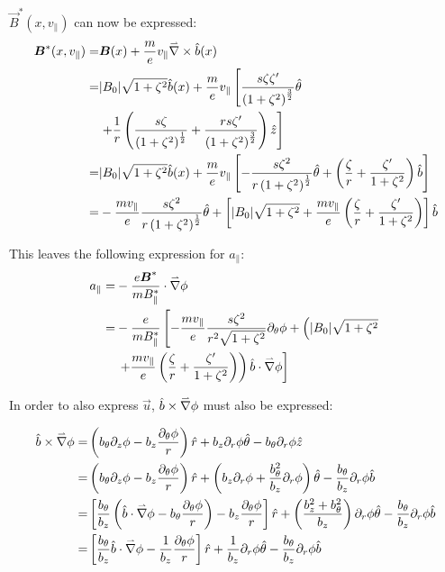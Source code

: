 $\vec{B}^*(x,v_\parallel)$ can now be expressed:
\begin{align*}
 \boldsymbol{B}^*(x,v_\parallel) =& \boldsymbol{B}(x) + \frac{m}{e}v_\parallel \accentset{\rightharpoonup}{\nabla} \times \hat{b}(x)\\
 =& |B_0|\sqrt{1+\zeta^2}\hat{b}(x) + \frac{m}{e}v_\parallel \left[\frac{s\zeta\zeta'}{\left(1+\zeta^2\right)^{\frac{3}{2}}}\hat{\theta}\right.\\
 & \left.+ \frac{1}{r}\left(\frac{s\zeta}{\left(1+\zeta^2\right)^{\frac{1}{2}}} + \frac{rs\zeta'}{\left(1+\zeta^2\right)^{\frac{3}{2}}}\right)\hat{z}\right]\\
 =& |B_0|\sqrt{1+\zeta^2}\hat{b}(x) + \frac{m}{e}v_\parallel \left[- \frac{s\zeta^2}{r\left(1+\zeta^2\right)^{\frac{1}{2}}} \hat{\theta} + \left(\frac{\zeta}{r} + \frac{\zeta'}{1+\zeta^2}\right)\hat{b}\right]\\
 =& - \frac{mv_\parallel}{e}\frac{s\zeta^2}{r\left(1+\zeta^2\right)^{\frac{1}{2}}} \hat{\theta} + \left[|B_0|\sqrt{1+\zeta^2} + \frac{mv_\parallel}{e}\left(\frac{\zeta}{r} + \frac{\zeta'}{1+\zeta^2}\right)\right]\hat{b}
\end{align*}

This leaves the following expression for $a_\parallel$:
\begin{align}
a_\parallel =& - \frac{e\boldsymbol{B}^*}{mB_\parallel^*}\cdot\accentset{\rightharpoonup}{\nabla}\phi\nonumber\\
=& -\frac{e}{mB_\parallel^*}\left[-\frac{mv_\parallel}{e}\frac{s\zeta^2}{r^2\sqrt{1+\zeta^2}}\partial_\theta\phi + \left(|B_0|\sqrt{1+\zeta^2}\right.\right.\nonumber\\
&\left.\left.+\frac{mv_\parallel}{e}\left(\frac{\zeta}{r}+\frac{\zeta'}{1+\zeta^2}\right)\right)\hat{b}\cdot\accentset{\rightharpoonup}{\nabla}\phi\right]\label{eq::a_parallel def cylinder}
\end{align}

In order to also express $\vec{u}$, $\hat{b}\times\accentset{\rightharpoonup}{\nabla}\phi$ must also be expressed:

\begin{align*}
 \hat{b}\times\accentset{\rightharpoonup}{\nabla}\phi =& \left(b_\theta \partial_z\phi - b_z \frac{\partial_\theta \phi}{r} \right)\hat{r} + b_z \partial_r\phi \hat{\theta} - b_\theta \partial_r \phi \hat{z}\\
 =& \left(b_\theta \partial_z\phi - b_z \frac{\partial_\theta \phi}{r} \right)\hat{r} + \left(b_z \partial_r\phi + \frac{b_\theta^2}{b_z} \partial_r \phi\right) \hat{\theta} - \frac{b_\theta}{b_z} \partial_r \phi \hat{b}\\
 =& \left[\frac{b_\theta}{b_z}\left(\hat{b}\cdot\accentset{\rightharpoonup}{\nabla}\phi - b_\theta \frac{\partial_\theta\phi}{r}\right) - b_z \frac{\partial_\theta \phi}{r} \right]\hat{r} + \left(\frac{b_z^2 + b_\theta^2}{b_z} \right)  \partial_r\phi \hat{\theta} - \frac{b_\theta}{b_z} \partial_r \phi \hat{b}\\
 =& \left[\frac{b_\theta}{b_z}\hat{b}\cdot\accentset{\rightharpoonup}{\nabla}\phi - \frac{1}{b_z} \frac{\partial_\theta \phi}{r} \right]\hat{r} + \frac{1}{b_z}   \partial_r\phi \hat{\theta} - \frac{b_\theta}{b_z} \partial_r \phi \hat{b}\\
\end{align*}

